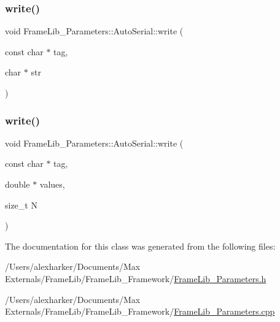 \subsubsection{\texorpdfstring{write()}{write()}\hspace{0.1cm}{\footnotesize\ttfamily [2/3]}}
{\footnotesize\ttfamily void Frame\+Lib\+\_\+\+Parameters\+::\+Auto\+Serial\+::write (\begin{DoxyParamCaption}\item[{const char $\ast$}]{tag,  }\item[{char $\ast$}]{str }\end{DoxyParamCaption})\hspace{0.3cm}{\ttfamily [inline]}}

\mbox{\label{class_frame_lib___parameters_1_1_auto_serial_a3066854fc6c246174b311f3849426a36}} 
\subsubsection{\texorpdfstring{write()}{write()}\hspace{0.1cm}{\footnotesize\ttfamily [3/3]}}
{\footnotesize\ttfamily void Frame\+Lib\+\_\+\+Parameters\+::\+Auto\+Serial\+::write (\begin{DoxyParamCaption}\item[{const char $\ast$}]{tag,  }\item[{double $\ast$}]{values,  }\item[{size\+\_\+t}]{N }\end{DoxyParamCaption})\hspace{0.3cm}{\ttfamily [inline]}}



The documentation for this class was generated from the following files\+:\begin{DoxyCompactItemize}
\item 
/\+Users/alexharker/\+Documents/\+Max Externals/\+Frame\+Lib/\+Frame\+Lib\+\_\+\+Framework/\hyperlink{_frame_lib___parameters_8h}{Frame\+Lib\+\_\+\+Parameters.\+h}\item 
/\+Users/alexharker/\+Documents/\+Max Externals/\+Frame\+Lib/\+Frame\+Lib\+\_\+\+Framework/\hyperlink{_frame_lib___parameters_8cpp}{Frame\+Lib\+\_\+\+Parameters.\+cpp}\end{DoxyCompactItemize}
